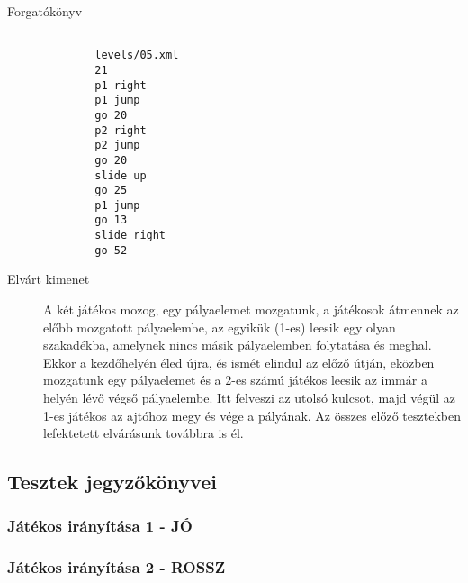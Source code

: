 \begin{description}
	\item[Forgatókönyv]
	\begin{verbatim}

		levels/05.xml
		21
		p1 right
		p1 jump
		go 20
		p2 right
		p2 jump
		go 20
		slide up
		go 25
		p1 jump
		go 13
		slide right
		go 52
	\end{verbatim}
	
	\item[Elvárt kimenet] A két játékos mozog, egy pályaelemet mozgatunk, a játékosok átmennek az előbb mozgatott pályaelembe, az egyikük (1-es) leesik egy olyan szakadékba, amelynek nincs másik pályaelemben folytatása és meghal. Ekkor a kezdőhelyén éled újra, és ismét elindul az előző útján, eközben mozgatunk egy pályaelemet és a 2-es számú játékos leesik az immár a helyén lévő végső pályaelembe. Itt felveszi az utolsó kulcsot, majd végül az 1-es játékos az ajtóhoz megy és vége a pályának. Az összes előző tesztekben lefektetett elvárásunk továbbra is él.
	
\end{description}

\newpage

\subsection{Tesztek jegyzőkönyvei}

\subsubsection{Játékos irányítása 1 - JÓ}

\begin{usecase}
\end{usecase}


\subsubsection{Játékos irányítása 2 - ROSSZ}

\begin{usecase}
\end{usecase}


